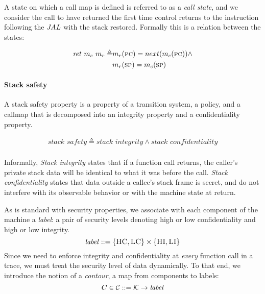 \documentclass[acmsmall,review,anonymous]{acmart}\settopmatter{printfolios=true,printccs=false,printacmref=false}
\begin{document}
A state on which a call map is defined is referred to as a {\it call
  state}, and we consider the call to have returned the first time
control returns to the instruction following the \(\mathit{JAL}\) with the
stack restored. Formally this is a relation between the states:
    
\[\begin{split}
\mathit{ret}\ m_c\ m_r \triangleq & m_r(\textsc{pc}) = next(m_c(\textsc{pc})) \land \\
& m_r(\textsc{sp}) = m_c(\textsc{sp})
\end{split}\]


\paragraph*{Stack safety}
  
A stack safety property is a property of a transition system, a
policy, and a callmap that is decomposed into an integrity property and a
confidentiality property.

    \[\begin{split}
      \textit{stack safety} \triangleq \textit{stack integrity} \land \textit{stack confidentiality} \\
    \end{split}\]

 Informally, {\it Stack
  integrity} states that if a function call returns, the caller's
private stack data will be identical to what it was before the
call. {\it Stack confidentiality} states that data outside a callee's
stack frame is secret, and do not interfere with its observable
behavior or with the machine state at return.

As is standard with security properties, we associate with each
component of the machine a {\em label}: a pair of security levels
denoting high or low confidentiality and high or low integrity.
%
\[\mathit{label} ::= \{\textsc{HC},\textsc{LC}\} \times \{\textsc{HI},\textsc{LI}\}\]
%
Since we need to enforce integrity and confidentiality at {\em every}
function call in a trace, we must treat the security level of data
dynamically. To that end, we introduce the notion of a {\em contour},
a map from components to labels:
%
\[C \in {\mathcal C} ::= {\mathcal K} \rightarrow \mathit{label}\]
\end{document}
